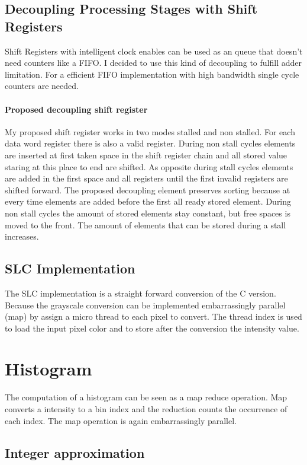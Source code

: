 \documentclass[a4paper]{scrartcl}
\begin{document}
\subsection{Decoupling Processing Stages with Shift Registers}

Shift Registers with intelligent clock enables can be used as an queue that doesn't need counters like a FIFO. I decided to use this kind of decoupling to fulfill adder limitation. For a efficient FIFO implementation with high bandwidth single cycle counters are needed.

\paragraph{Proposed decoupling shift register}
My proposed shift register works in two modes stalled and non stalled. For each data word register there is also a valid register. During non stall cycles elements are inserted at first taken space in the shift register chain and all stored value staring at this place to end are shifted. As opposite during stall cycles elements are added in the first space and all registers until the first invalid registers are shifted forward. The proposed decoupling element preserves sorting because at every time elements are added before the first all ready stored element. During non stall cycles the amount of stored elements stay constant, but free spaces is moved to the front. The amount of elements that can be stored during a stall increases.

\subsection{SLC Implementation}
The SLC implementation is a straight forward conversion of the C version. Because the grayscale conversion can be implemented embarrassingly parallel (map) by assign a micro thread to each pixel to convert. The thread index is used to load the input pixel color and to store after the conversion the intensity value.

\section{Histogram}
The computation of a histogram can be seen as a map reduce operation. Map converts a intensity to a bin index and the reduction counts the occurrence of each index. The map operation is again embarrassingly parallel. 

\subsection{Integer approximation}
\end{document}

